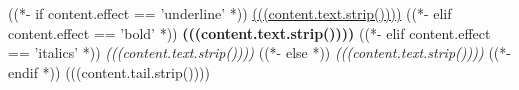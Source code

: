((*- if content.effect == 'underline' *))
 \uline{(((content.text.strip())))} 
((*- elif content.effect == 'bold' *))
 \textbf{(((content.text.strip())))} 
((*- elif content.effect == 'italics' *))
 \textit{(((content.text.strip())))} 
((*- else *))
 \emph{(((content.text.strip())))} 
((*- endif *)) (((content.tail.strip())))

